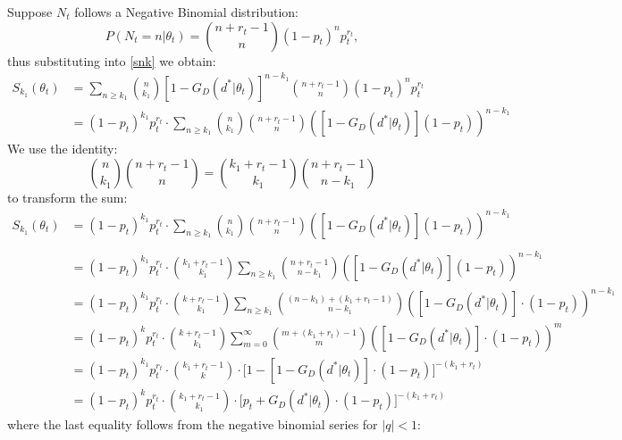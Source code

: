 \documentclass{article}
\begin{document}
Suppose $N_t$ follows a Negative Binomial distribution:
$$
P(N_t = n|\theta_t) = \binom{n + r_t - 1}{n} (1 - p_t)^n p_t^{r_t},
$$
thus substituting into \eqref{snk} we obtain:
\begin{equation}\label{negbinlikelihood}
\begin{aligned}
    S_{k_1}(\theta_t) & = \sum\limits_{n \geq k_1} \binom{n}{k_1} \left[1 - G_D(d^*|\theta_t)\right]^{n - k_1} \binom{n + r_t - 1}{n} (1 - p_t)^n p_t^{r_t}
    \\ & = (1 - p_t)^{k_1} p_t^{r_t} \cdot \sum\limits_{n \geq k_1} \binom{n}{k_1} \binom{n + r_t - 1}{n} \left(\left[1 - G_D(d^*|\theta_t)\right](1 - p_t)\right)^{n - k_1}  
\end{aligned}
\end{equation}
We use the identity:
\begin{equation}
    \binom{n}{k_1} \binom{n + r_t - 1}{n} =\binom{k_1 + r_t - 1}{k_1}\binom{n + r_t - 1}{n - k_1}
\end{equation}
to transform the sum:
\begin{equation}\label{sumnegbin}
\begin{aligned}
S_{k_1}(\theta_t) &  = (1 - p_t)^{k_1} p_t^{r_t} \cdot \sum\limits_{n \geq k_1} \binom{n}{k_1} \binom{n + r_t - 1}{n} \left(\left[1 - G_D(d^*|\theta_t)\right](1 - p_t)\right)^{n - k_1} \\
    \\ & = (1 - p_t)^{k_1} p_t^{r_t} \cdot\binom{k_1 + r_t - 1}{k_1} \sum\limits_{n \geq k_1}  \binom{n + r_t - 1}{n -k_1}\left(\left[1 - G_D(d^*|\theta_t)\right](1 - p_t)\right)^{n - k_1} 
    \\ & = (1 - p_t)^{k_1} p_t^{r_t}\cdot \binom{k + r_t - 1}{k_1} \sum\limits_{n \geq k_1}  \binom{(n  - k_1) + (k_1 + r_t - 1)}{n -k_1}\left(\left[1 - G_D(d^*|\theta_t)\right]\cdot(1 - p_t)\right)^{n - k_1} 
    \\ & = (1 - p_t)^{k} p_t^{r_t}\cdot\binom{k + r_t - 1}{k_1} \sum\limits_{m = 0}^{\infty}  \binom{m + (k_1 + r_t) - 1}{m}\left(\left[1 - G_D(d^*|\theta_t)\right]\cdot(1 - p_t)\right)^{m} 
    \\ & = (1 - p_t)^{k_1} p_t^{r_t}\cdot\binom{k_1 + r_t - 1}{k} \cdot \Big[1 -  \left[1 - G_D(d^*|\theta_t)\right]\cdot(1 - p_t) \Big]^{-(k_1 + r_t)}
    \\ & = (1 - p_t)^{k} p_t^{r_t}\cdot\binom{k_1 + r_t - 1}{k_1} \cdot \Big[p_t + G_D(d^*|\theta_t)\cdot (1 - p_t) \Big]^{-(k_1 + r_t)}
\end{aligned}
\end{equation}
where the last equality follows from the negative binomial series for $|q| < 1$:
\end{document}
